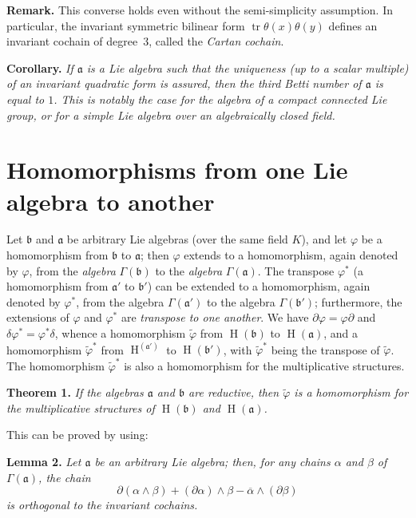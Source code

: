 \documentclass{article}
\newcommand{\fk}{\mathfrak}
\DeclareMathOperator{\HH}{H}
\DeclareMathOperator{\tr}{tr}
\begin{document}
\medskip
\textbf{Remark.}
This converse holds even without the semi-simplicity assumption.
In particular, the invariant symmetric bilinear form $\tr\theta(x)\theta(y)$ defines an invariant cochain of degree~$3$, called the \emph{Cartan cochain}.

\medskip
\textbf{Corollary.}
{\itshape
  If $\fk{a}$ is a Lie algebra such that the \emph{uniqueness} (up to a scalar multiple) of an invariant quadratic form is assured, then the third Betti number of $\fk{a}$ is equal to $1$.
  This is notably the case for the algebra of a compact connected Lie group, or for a simple Lie algebra over an algebraically closed field.
}

\section{Homomorphisms from one Lie algebra to another}
\label{II.6}

Let $\fk{b}$ and $\fk{a}$ be arbitrary Lie algebras (over the same field $K$), and let $\varphi$ be a homomorphism from $\fk{b}$ to $\fk{a}$;
then $\varphi$ extends to a homomorphism, again denoted by $\varphi$, from the \emph{algebra} $\Gamma(\fk{b})$ to the \emph{algebra} $\Gamma(\fk{a})$.
The transpose $\varphi^*$ (a homomorphism from $\fk{a}'$ to $\fk{b}'$) can be extended to a homomorphism, again denoted by $\varphi^*$, from the algebra $\Gamma(\fk{a}')$ to the algebra $\Gamma(\fk{b}')$;
furthermore, the extensions of $\varphi$ and $\varphi^*$ are \emph{transpose to one another}.
We have $\partial\varphi=\varphi\partial$ and $\delta\varphi^*=\varphi^*\delta$, whence a homomorphism $\widetilde{\varphi}$ from $\HH(\fk{b})$ to $\HH(\fk{a})$, and a homomorphism $\widetilde{\varphi}^*$ from $\HH^(\fk{a}')$ to $\HH(\fk{b}')$, with $\widetilde{\varphi}^*$ being the transpose of $\widetilde{\varphi}$.
The homomorphism $\widetilde{\varphi}^*$ is also a homomorphism for the multiplicative structures.

\medskip
\textbf{Theorem 1.}
\label{theorem1}
{\itshape
  If the algebras $\fk{a}$ and $\fk{b}$ are \emph{reductive}, then $\widetilde{\varphi}$ is a homomorphism for the multiplicative structures of $\HH(\fk{b})$ and $\HH(\fk{a})$.
}
\medskip

This can be proved by using:

\medskip
\textbf{Lemma 2.}
\label{lemma2}
{\itshape
  Let $\fk{a}$ be an arbitrary Lie algebra;
  then, for any chains $\alpha$ and $\beta$ of $\Gamma(\fk{a})$, the chain
  \[
    \partial(\alpha\wedge\beta) + (\partial\alpha)\wedge\beta - \overline{\alpha}\wedge(\partial\beta)
  \]
  is orthogonal to the invariant cochains.
}
\medskip
\end{document}
